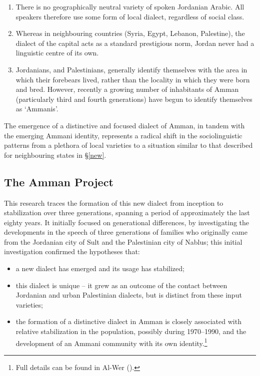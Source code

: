 \documentclass[output=paper]{langsci/langscibook}
\begin{document}
\begin{enumerate}
\item 
There is no geographically neutral variety of spoken Jordanian Arabic. All speakers therefore use some form of local dialect, regardless of social class.

\item 
Whereas in neighbouring countries (Syria, Egypt, Lebanon, Palestine), the dialect of the capital acts as a standard prestigious norm, Jordan never had a linguistic centre of its own.

\item 
Jordanians, and Palestinians, generally identify themselves with the area in which their forebears lived, rather than the locality in which they were born and bred. However, recently a growing number of inhabitants of Amman (particularly third and fourth generations) have begun to identify themselves as ‘Ammanis’.

\end{enumerate}

The emergence of a distinctive and focused dialect of Amman, in tandem with the emerging Ammani identity, represents a radical shift in the sociolinguistic patterns from a plethora of local varieties to a situation similar to that described for neighbouring states in §\ref{new}.

\subsection{The Amman Project}

This research traces the formation of this new dialect from inception to stabilization over three generations, spanning a period of approximately the last eighty years. It initially focused on generational differences, by investigating the developments in the speech of three generations of families who originally came from the Jordanian city of Sult and the Palestinian city of Nablus; this initial investigation confirmed the hypotheses that:

\begin{itemize}
\item[] 
a new dialect has emerged and its usage has stabilized;

\item[]
this dialect is unique -- it grew as an outcome of the contact between Jordanian and urban Palestinian dialects, but is distinct from these input varieties;

\item[] 
the formation of a distinctive dialect in Amman is closely associated with relative stabilization in the population, possibly during 1970–1990, and the development of an Ammani community with its own identity.\footnote{Full details can be found in Al-Wer (\citeyear{Al-Wer2002,Al-Wer2003kum}).}

\end{itemize}
\end{document}
